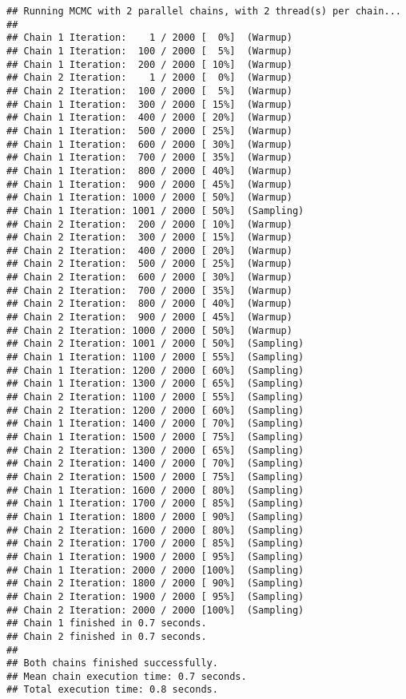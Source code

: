 \documentclass[
]{article}
\begin{document}
\begin{verbatim}
## Running MCMC with 2 parallel chains, with 2 thread(s) per chain...
## 
## Chain 1 Iteration:    1 / 2000 [  0%]  (Warmup) 
## Chain 1 Iteration:  100 / 2000 [  5%]  (Warmup) 
## Chain 1 Iteration:  200 / 2000 [ 10%]  (Warmup) 
## Chain 2 Iteration:    1 / 2000 [  0%]  (Warmup) 
## Chain 2 Iteration:  100 / 2000 [  5%]  (Warmup) 
## Chain 1 Iteration:  300 / 2000 [ 15%]  (Warmup) 
## Chain 1 Iteration:  400 / 2000 [ 20%]  (Warmup) 
## Chain 1 Iteration:  500 / 2000 [ 25%]  (Warmup) 
## Chain 1 Iteration:  600 / 2000 [ 30%]  (Warmup) 
## Chain 1 Iteration:  700 / 2000 [ 35%]  (Warmup) 
## Chain 1 Iteration:  800 / 2000 [ 40%]  (Warmup) 
## Chain 1 Iteration:  900 / 2000 [ 45%]  (Warmup) 
## Chain 1 Iteration: 1000 / 2000 [ 50%]  (Warmup) 
## Chain 1 Iteration: 1001 / 2000 [ 50%]  (Sampling) 
## Chain 2 Iteration:  200 / 2000 [ 10%]  (Warmup) 
## Chain 2 Iteration:  300 / 2000 [ 15%]  (Warmup) 
## Chain 2 Iteration:  400 / 2000 [ 20%]  (Warmup) 
## Chain 2 Iteration:  500 / 2000 [ 25%]  (Warmup) 
## Chain 2 Iteration:  600 / 2000 [ 30%]  (Warmup) 
## Chain 2 Iteration:  700 / 2000 [ 35%]  (Warmup) 
## Chain 2 Iteration:  800 / 2000 [ 40%]  (Warmup) 
## Chain 2 Iteration:  900 / 2000 [ 45%]  (Warmup) 
## Chain 2 Iteration: 1000 / 2000 [ 50%]  (Warmup) 
## Chain 2 Iteration: 1001 / 2000 [ 50%]  (Sampling) 
## Chain 1 Iteration: 1100 / 2000 [ 55%]  (Sampling) 
## Chain 1 Iteration: 1200 / 2000 [ 60%]  (Sampling) 
## Chain 1 Iteration: 1300 / 2000 [ 65%]  (Sampling) 
## Chain 2 Iteration: 1100 / 2000 [ 55%]  (Sampling) 
## Chain 2 Iteration: 1200 / 2000 [ 60%]  (Sampling) 
## Chain 1 Iteration: 1400 / 2000 [ 70%]  (Sampling) 
## Chain 1 Iteration: 1500 / 2000 [ 75%]  (Sampling) 
## Chain 2 Iteration: 1300 / 2000 [ 65%]  (Sampling) 
## Chain 2 Iteration: 1400 / 2000 [ 70%]  (Sampling) 
## Chain 2 Iteration: 1500 / 2000 [ 75%]  (Sampling) 
## Chain 1 Iteration: 1600 / 2000 [ 80%]  (Sampling) 
## Chain 1 Iteration: 1700 / 2000 [ 85%]  (Sampling) 
## Chain 1 Iteration: 1800 / 2000 [ 90%]  (Sampling) 
## Chain 2 Iteration: 1600 / 2000 [ 80%]  (Sampling) 
## Chain 2 Iteration: 1700 / 2000 [ 85%]  (Sampling) 
## Chain 1 Iteration: 1900 / 2000 [ 95%]  (Sampling) 
## Chain 1 Iteration: 2000 / 2000 [100%]  (Sampling) 
## Chain 2 Iteration: 1800 / 2000 [ 90%]  (Sampling) 
## Chain 2 Iteration: 1900 / 2000 [ 95%]  (Sampling) 
## Chain 2 Iteration: 2000 / 2000 [100%]  (Sampling) 
## Chain 1 finished in 0.7 seconds.
## Chain 2 finished in 0.7 seconds.
## 
## Both chains finished successfully.
## Mean chain execution time: 0.7 seconds.
## Total execution time: 0.8 seconds.
\end{verbatim}
\end{document}
